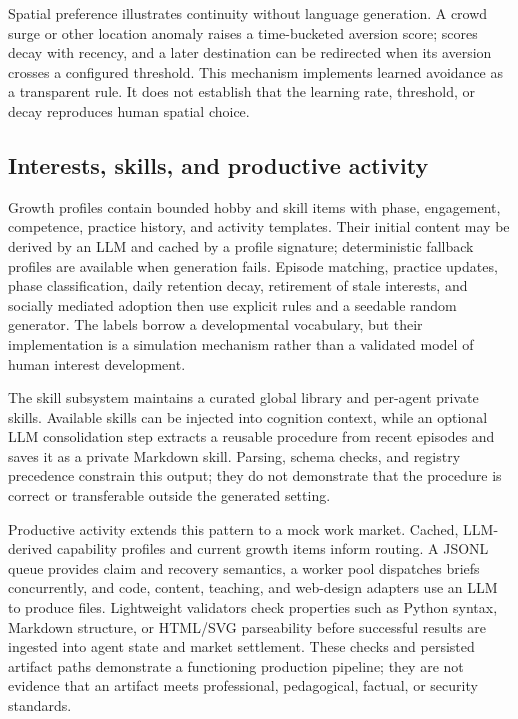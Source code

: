 Spatial preference illustrates continuity without language generation.  A
crowd surge or other location anomaly raises a time-bucketed aversion score;
scores decay with recency, and a later destination can be redirected when its
aversion crosses a configured threshold.  This mechanism implements learned
avoidance as a transparent rule.  It does not establish that the learning
rate, threshold, or decay reproduces human spatial choice.

\subsection{Interests, skills, and productive activity}

Growth profiles contain bounded hobby and skill items with phase, engagement,
competence, practice history, and activity templates.  Their initial content
may be derived by an LLM and cached by a profile signature; deterministic
fallback profiles are available when generation fails.  Episode matching,
practice updates, phase classification, daily retention decay, retirement of
stale interests, and socially mediated adoption then use explicit rules and a
seedable random generator.  The labels borrow a developmental vocabulary, but
their implementation is a simulation mechanism rather than a validated model
of human interest development.

The skill subsystem maintains a curated global library and per-agent private
skills.  Available skills can be injected into cognition context, while an
optional LLM consolidation step extracts a reusable procedure from recent
episodes and saves it as a private Markdown skill.  Parsing, schema checks,
and registry precedence constrain this output; they do not demonstrate that
the procedure is correct or transferable outside the generated setting.

Productive activity extends this pattern to a mock work market.  Cached,
LLM-derived capability profiles and current growth items inform routing.  A
JSONL queue provides claim and recovery semantics, a worker pool dispatches
briefs concurrently, and code, content, teaching, and web-design adapters use
an LLM to produce files.  Lightweight validators check properties such as
Python syntax, Markdown structure, or HTML/SVG parseability before successful
results are ingested into agent state and market settlement.  These checks and
persisted artifact paths demonstrate a functioning production pipeline; they
are not evidence that an artifact meets professional, pedagogical, factual, or
security standards.

